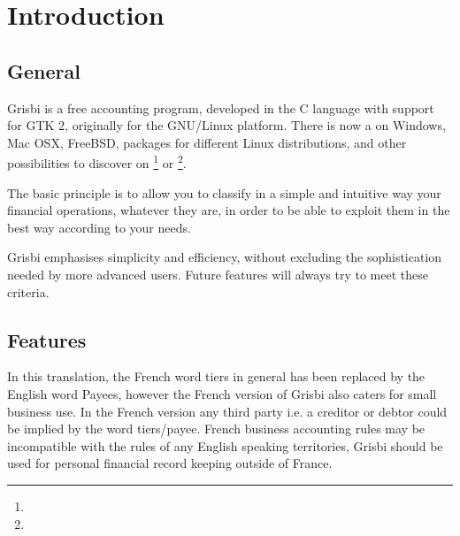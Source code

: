 







\chapter{Introduction\label{introduction}}

\section{General \label{introduction-General}}

Grisbi is a free accounting program, developed in the \gls{C language} with support for \gls{GTK} 2, 
originally for the \gls{GNU/Linux} platform. There is now a   on Windows, Mac OSX, FreeBSD, packages for different  \gls{Linux distributions}, and other possibilities to discover on \footnote{\urlGrisbi{}} or 
 \footnote{\urlSourceForge{}}.

The basic principle is to allow you to classify in a simple and intuitive way your financial operations, whatever they are, in order to be able to exploit them in the best way according to your needs.

Grisbi emphasises simplicity and efficiency, without excluding the sophistication needed by more advanced users. Future features will always try to meet these criteria.

\section{Features \label{introduction-features}}

 In this translation, the French word tiers in general has been replaced by the English word Payees, however the French version of Grisbi also caters for small business use. In the French version any third party i.e. a creditor or debtor could be implied by the word tiers/payee.  French business accounting rules may be incompatible with the rules of any English speaking territories, Grisbi should be used  for personal financial record keeping outside of France.



